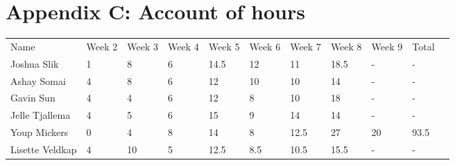 \chapter*{Appendix C: Account of hours}

\begin{table}[h]
\begin{tabular}{| l | l | l | l | l | l | l | l | l | l | l}
 Name & Week 2 & Week 3 & Week 4 & Week 5 & Week 6 & Week 7 & Week 8 & Week 9 & Total & \\
 Joshua Slik & 1 & 8 & 6 & 14.5 & 12 & 11 & 18.5 & - & - & \\
 Ashay Somai & 4 & 8 & 6 & 12 & 10 & 10 & 14 & - & - & \\
 Gavin Sun & 4 & 4 & 6 & 12 & 8 & 10 & 18 & - & - & \\
 Jelle Tjallema & 4 & 5 & 6 & 15 & 9 & 14 & 14 & - & - & \\
 Youp Mickers & 0 & 4 & 8 & 14 & 8 & 12.5 & 27 & 20 & 93.5 & \\
 Lisette Veldkap & 4 & 10 & 5 & 12.5 & 8.5 & 10.5 & 15.5 & - & - & \\
\end{tabular}
\end{table}